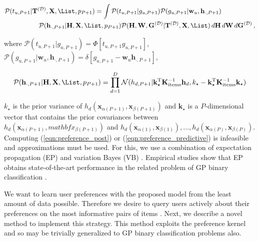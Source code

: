 \begin{align}
	\mathcal{P}(t_{u,P+1}|&\mathbf{T}^{(\mathcal{D})},\mathbf{X},\List,p_{P+1}) =
	\int \mathcal{P}(t_{u,P+1}|g_{u,P+1}) \mathcal{P}(g_{u,P+1}|\mathbf{w}_u,\mathbf{h}_{\cdot,P+1})\notag\\
	 & \quad \mathcal{P}(\mathbf{h}_{\cdot,P+1}|\mathbf{H},\mathbf{X},\List,p_{P+1})
	\mathcal{P}(\mathbf{H},\mathbf{W},\mathbf{G}^{(\mathcal{D})}|\mathbf{T}^{(\mathcal{D})},\mathbf{X},\List)
	\,d\mathbf{H}\,d\mathbf{W}\,d\mathbf{G}^{(\mathcal{D})}\,,
	\label{eqn:preference_predictions}
\end{align}

where $\mathcal{P}(t_{u,P+1}|g_{u,P+1})=\Phi[t_{u,P+1}g_{u,P+1}]$, $\mathcal{P}(g_{u,P+1}|\mathbf{w}_u,\mathbf{h}_{\cdot,P+1})=\delta[ g_{u,P+1} - \mathbf{w}_u \mathbf{h}_{\cdot,P+1}]$,

\begin{equation}
	\mathcal{P}(\mathbf{h}_{\cdot,P+1}|\mathbf{H},\mathbf{X},\List,p_{P+1})
	=\prod_{d=1}^D \mathcal{N}(h_{d,P+1}|\mathbf{k}_\star^\text{T} \mathbf{K}^{-1}_\text{items} \mathbf{h}_d, k_\star -
	\mathbf{k}_\star^\text{T}  \mathbf{K}^{-1}_\text{items} \mathbf{k}_\star)
	\label{eqn:preference_predictive}
\end{equation}

$k_\star$ is the prior variance of $h_d(\mathbf{x}_{\alpha(P+1)}, \mathbf{x}_{\beta(P+1)})$ and $\mathbf{k}_\star$ is a $P$-dimensional vector that contains the prior covariances between $h_d(\mathbf{x}_{\alpha(P+1)},  mathbf{x}_{\beta(P+1)})$ and $h_d(\mathbf{x}_{\alpha(1)}, \mathbf{x}_{\beta(1)}),\ldots,h_d(\mathbf{x}_{\alpha(P)}, \mathbf{x}_{\beta(P)})$. Computing (\ref{eqn:preference_post}) or (\ref{eqn:preference_predictive}) is infeasible and approximations must be used. For this, we use a combination of expectation propagation (EP) \citep{Minka2001} and variation Bayes (VB) \citep{Ghahramani2001}. Empirical studies show that EP obtains state-of-the-art performance  in the related problem of GP binary classification \citep{Nickisch2008}.

We want to learn user preferences with the proposed model from the least amount of data possible. Therefore we desire to query users actively about their preferences on the most informative pairs of items \citep{Brochu2007active}. Next, we describe a novel method to implement this strategy. This method exploits the preference kernel and so may be trivially generalized to GP binary classification problems also.

